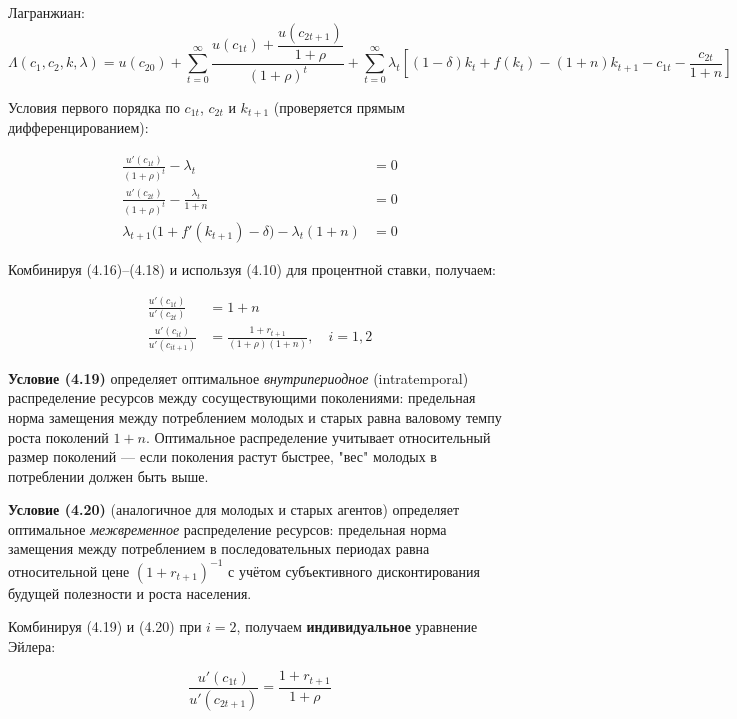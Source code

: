 \documentclass[10pt,a4paper]{article}
\begin{document}
Лагранжиан:
$$\Lambda(c_1,c_2,k,\lambda) = u(c_{20}) + \sum_{t=0}^{\infty} \frac{u(c_{1t}) + \dfrac{u(c_{2t+1})}{1+\rho}}{(1+\rho)^t} + \sum_{t=0}^{\infty}\lambda_t\left[(1-\delta)k_t + f(k_t) - (1+n)k_{t+1} - c_{1t} - \frac{c_{2t}}{1+n}\right]$$

Условия первого порядка по $c_{1t}$, $c_{2t}$ и $k_{t+1}$ (проверяется прямым дифференцированием):
\begin{formulabox}
\begin{align}
\frac{u'(c_{1t})}{(1+\rho)^t} - \lambda_t &= 0 \tag{4.16}\\
\frac{u'(c_{2t})}{(1+\rho)^t} - \frac{\lambda_t}{1+n} &= 0 \tag{4.17}\\
\lambda_{t+1}\big(1+f'(k_{t+1}) - \delta\big) - \lambda_t(1+n) &= 0 \tag{4.18}
\end{align}
\end{formulabox}

Комбинируя (4.16)--(4.18) и используя (4.10) для процентной ставки, получаем:
\begin{formulabox}
\begin{align}
\frac{u'(c_{1t})}{u'(c_{2t})} &= 1+n \tag{4.19}\\
\frac{u'(c_{it})}{u'(c_{it+1})} &= \frac{1+r_{t+1}}{(1+\rho)(1+n)}, \quad i=1,2 \tag{4.20}
\end{align}
\end{formulabox}

\begin{intuition}
\textbf{Условие (4.19)} определяет оптимальное \textit{внутрипериодное} (intratemporal) распределение ресурсов между сосуществующими поколениями: предельная норма замещения между потреблением молодых и старых равна валовому темпу роста поколений $1+n$. Оптимальное распределение учитывает относительный размер поколений — если поколения растут быстрее, "вес" молодых в потреблении должен быть выше.

\textbf{Условие (4.20)} (аналогичное для молодых и старых агентов) определяет оптимальное \textit{межвременное} распределение ресурсов: предельная норма замещения между потреблением в последовательных периодах равна относительной цене $(1+r_{t+1})^{-1}$ с учётом субъективного дисконтирования будущей полезности и роста населения.
\end{intuition}

Комбинируя (4.19) и (4.20) при $i=2$, получаем \textbf{индивидуальное} уравнение Эйлера:
\begin{formulabox}
\begin{equation}
\frac{u'(c_{1t})}{u'(c_{2t+1})} = \frac{1+r_{t+1}}{1+\rho} \tag{4.5}
\end{equation}
\end{formulabox}
\end{document}
